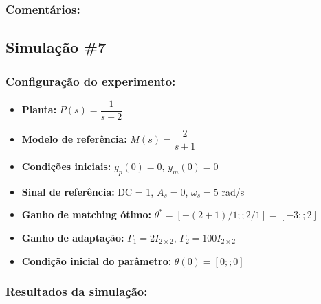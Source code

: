 \documentclass[10pt]{article}
\begin{document}
\subsubsection{Comentários:}

\subsection{Simulação \#7}
\subsubsection{Configuração do experimento:}
\begin{itemize}
\item \textbf{Planta:} $P(s) = \dfrac{1}{s - 2}$
\item \textbf{Modelo de referência:} $M(s) = \dfrac{2}{s + 1}$
\item \textbf{Condições iniciais:} $y_p(0)=0$, $y_m(0)=0$
\item \textbf{Sinal de referência:} DC = 1, $A_s=0$, $\omega_s=5$ rad/s
\item \textbf{Ganho de matching ótimo:} $\theta^* = [-(2+1)/1;;2/1] = [-3;;2]$
\item \textbf{Ganho de adaptação:} $\Gamma_1 = 2I_{2\times2}$, $\Gamma_2 = 100I_{2\times2}$
\item \textbf{Condição inicial do parâmetro:} $\theta(0) = [0;;0]$
\end{itemize}

\subsubsection{Resultados da simulação:}
\end{document}
